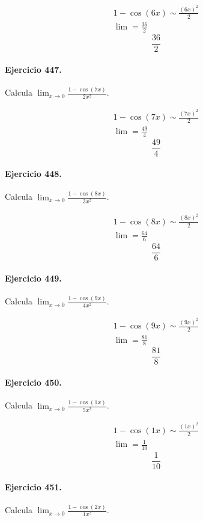 \documentclass[11pt,a4paper]{article}
\begin{document}
\[
\begin{aligned}
1-\cos(6x)\sim \frac{(6x)^2}{2}\\
\lim=\frac{36}{2}
\end{aligned}
\]
\[\boxed{\frac{36}{2}}\]


\paragraph{Ejercicio 447.} Calcula $\displaystyle\lim_{x\to0}\frac{1-\cos(7x)}{2x^2}$.

\[
\begin{aligned}
1-\cos(7x)\sim \frac{(7x)^2}{2}\\
\lim=\frac{49}{4}
\end{aligned}
\]
\[\boxed{\frac{49}{4}}\]


\paragraph{Ejercicio 448.} Calcula $\displaystyle\lim_{x\to0}\frac{1-\cos(8x)}{3x^2}$.

\[
\begin{aligned}
1-\cos(8x)\sim \frac{(8x)^2}{2}\\
\lim=\frac{64}{6}
\end{aligned}
\]
\[\boxed{\frac{64}{6}}\]


\paragraph{Ejercicio 449.} Calcula $\displaystyle\lim_{x\to0}\frac{1-\cos(9x)}{4x^2}$.

\[
\begin{aligned}
1-\cos(9x)\sim \frac{(9x)^2}{2}\\
\lim=\frac{81}{8}
\end{aligned}
\]
\[\boxed{\frac{81}{8}}\]


\paragraph{Ejercicio 450.} Calcula $\displaystyle\lim_{x\to0}\frac{1-\cos(1x)}{5x^2}$.

\[
\begin{aligned}
1-\cos(1x)\sim \frac{(1x)^2}{2}\\
\lim=\frac{1}{10}
\end{aligned}
\]
\[\boxed{\frac{1}{10}}\]


\paragraph{Ejercicio 451.} Calcula $\displaystyle\lim_{x\to0}\frac{1-\cos(2x)}{1x^2}$.
\end{document}

